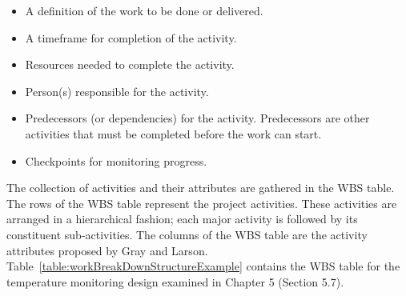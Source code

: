 \begin{itemize}
\item
  A definition of the work to be done or delivered.
\item
  A timeframe for completion of the activity.
\item
  Resources needed to complete the activity.
\item
  Person(s) responsible for the activity.
\item
  Predecessors (or dependencies) for the activity. Predecessors are
  other activities that must be completed before the work can start.
\item
  Checkpoints for monitoring progress.
\end{itemize}

The collection of activities and their attributes are gathered in the
WBS table. The rows of the WBS table represent the project activities.
These activities are arranged in a hierarchical fashion; each major
activity is followed by its constituent sub-activities. The columns of
the WBS table are the activity attributes proposed by Gray and Larson.
Table~\ref{table:workBreakDownStructureExample}
contains the WBS table for the temperature monitoring design
examined in Chapter 5 (Section 5.7).

